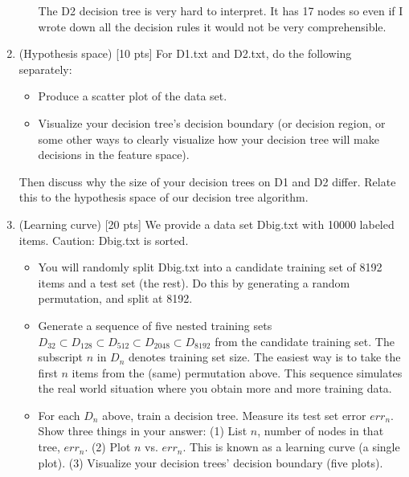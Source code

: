 \documentclass[a4paper]{article}
\theoremstyle{definition}
\newenvironment{soln}{
    \leavevmode\color{blue}\ignorespaces
}{}
\begin{document}
\begin{enumerate}
\begin{itemize}
  \begin{soln}
    The D2 decision tree is very hard to interpret.
    It has 17 nodes so even if I wrote down all the decision rules it would not be very comprehensible.
  \end{soln}
  
  \end{itemize}

\item (Hypothesis space)  [10 pts] For D1.txt and D2.txt, do the following separately:
  \begin{itemize}
  
  \item Produce a scatter plot of the data set.

  \item Visualize your decision tree's decision boundary (or decision region, or some other ways to clearly visualize how your decision tree will make decisions in the feature space).

  \end{itemize}
Then discuss why the size of your decision trees on D1 and D2 differ.  Relate this to the hypothesis space of our decision tree algorithm. \\

\item (Learning curve)  [20 pts] We provide a data set Dbig.txt with 10000 labeled items.  Caution: Dbig.txt is sorted.
  \begin{itemize}
  
  \item You will randomly split Dbig.txt into a candidate training set of 8192 items and a test set (the rest).  Do this by generating a random permutation, and split at 8192.
  
  \item Generate a sequence of five nested training sets $D_{32} \subset D_{128} \subset D_{512} \subset D_{2048} \subset D_{8192}$ from the candidate training set.  The subscript $n$ in $D_n$ denotes training set size.  The easiest way is to take the first $n$ items from the (same) permutation above.  This sequence simulates the real world situation where you obtain more and more training data.
  
  \item For each $D_n$ above, train a decision tree.  Measure its test set error $err_n$.  Show three things in your answer: (1) List $n$, number of nodes in that tree, $err_n$. (2) Plot $n$ vs. $err_n$.  This is known as a learning curve (a single plot). (3) Visualize your decision trees' decision boundary (five plots). \\
  \end{itemize}
  
\end{enumerate}
\end{document}

